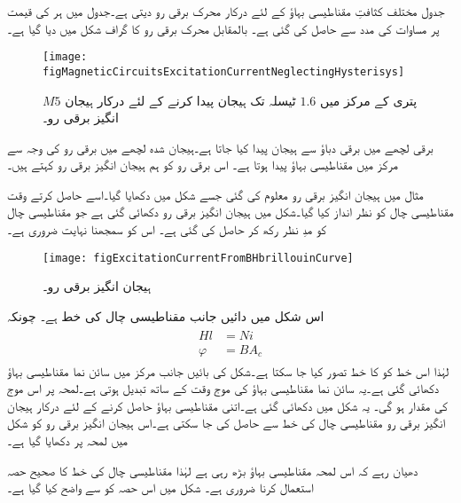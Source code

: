 جدول   مختلف کثافتِ مقناطیسی بہاؤ کے لئے درکار محرک برقی رو دیتی ہے۔جدول میں  ہر  کی قیمت پر   مساوات   کی مدد سے حاصل کی گئی ہے۔ بالمقابل محرک برقی رو کا گراف شکل  میں دیا گیا ہے۔
%
\begin{figure}
\centering
\texttt{[image: figMagneticCircuitsExcitationCurrentNeglectingHysterisys]}
\caption{$M5$ پتری کے مرکز میں $1.6$ ٹیسلہ تک ہیجان پیدا کرنے کے لئے درکار ہیجان انگیز برقی رو۔}
\label{شکل_مقناطیسی_ادوار_ہیجان_رو_چال_نظرانداز}
\end{figure}
برقی لچھے میں برقی دباؤ سے ہیجان پیدا کیا جاتا ہے۔ہیجان شدہ لچھے میں برقی رو کی وجہ سے  مرکز میں مقناطیسی بہاؤ پیدا ہوتا ہے۔ اس برقی رو  کو ہم ہیجان انگیز برقی رو  کہتے ہیں۔

مثال  میں ہیجان انگیز برقی رو معلوم کی گئی جسے شکل  میں دکھایا گیا۔اسے حاصل کرتے وقت مقناطیسی چال کو نظر انداز کیا گیا۔شکل  میں ہیجان انگیز برقی رو دکھائی گئی ہے جو مقناطیسی چال کو مدِ نظر رکھ کر حاصل کی گئی ہے۔ اس کو سمجھنا نہایت ضروری ہے۔
\begin{figure}
\centering
\texttt{[image: figExcitationCurrentFromBHbrillouinCurve]}
\caption{ہیجان انگیز برقی رو۔}
\label{شکل_مقناطیسی_ادوار_ہیجان_رو_بشمول_اثر_چال}
\end{figure}
اس شکل  میں دائیں جانب مقناطیسی چال کی خط ہے۔ چونکہ 
\begin{gather}
\begin{aligned}
H l& =N i\\
\varphi&=B A_c
\end{aligned}
\end{gather}
لہٰذا اس خط کو  کا خط تصور کیا جا سکتا ہے۔شکل کی بائیں جانب مرکز میں سائن نما مقناطیسی بہاؤ  دکھائی گئی ہے۔یہ سائن نما مقناطیسی بہاؤ کی موج وقت کے ساتھ تبدیل ہوتی ہے۔لمحہ  پر اس موج کی مقدار   ہو گی۔ یہ شکل میں دکھائی گئی ہے۔اتنی مقناطیسی بہاؤ حاصل کرنے کے لئے درکار ہیجان انگیز برقی رو  مقناطیسی چال کی خط سے حاصل کی جا سکتی ہے۔اس  ہیجان انگیز برقی رو کو شکل میں لمحہ  پر دکھایا گیا ہے۔ 

دھیان رہے کہ اس لمحہ مقناطیسی بہاؤ بڑھ رہی ہے لہٰذا مقناطیسی چال کی خط کا صحیح حصہ استعمال کرنا ضروری ہے۔ شکل   میں اس حصہ  کو  سے واضح کیا گیا ہے۔


